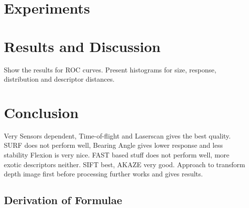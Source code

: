 \documentclass[doktyp=marbeit,fontsize=12pt,sprache=english,hausschrift=true]{TUBAFarbeiten}
\begin{document}
\section{Experiments}





\newpage

\section{Results and Discussion}\label{sec:results}

Show the results for ROC curves.
Present histograms for size, response, distribution and descriptor distances.





\newpage

\section{Conclusion}

Very Sensors dependent, Time-of-flight and Laserscan gives the best quality.
SURF does not perform well, Bearing Angle gives lower response and less stability
Flexion is very nice.
FAST based stuff does not perform well, more exotic descriptors neither.
SIFT best, AKAZE very good.
Approach to transform depth image first before processing further works and gives results.


\newpage

\begin{appendix}
    \renewcommand*{\thepage}{\thesection\arabic{page}}
    \renewcommand{\thetable}{\thesection\arabic{table}}
    \renewcommand{\thefigure}{\thesection\arabic{figure}}

    \newpage

    \section{Derivation of Formulae}
    

    \newpage

    
    

    \newpage
    \listoftables

    \newpage
    \listoffigures

    \newpage
\end{appendix}
\end{document}

